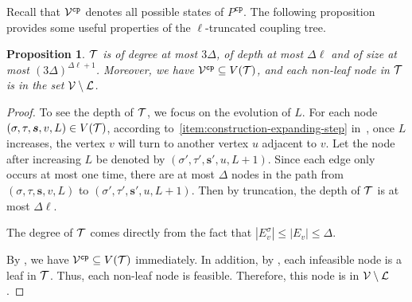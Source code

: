 \documentclass[11pt]{article}
\newtheorem{proposition}[theorem]{Proposition}
\newcommand{\abs}[1]{\left\vert#1\right\vert}
\def\!#1{\mathtt{#1}}
\def\cp{\!{cp}}
\newcommand{\seqS}{\boldsymbol{s}}
\newcommand{\hktodo}[1]{{\color{blue}{#1}}}
\begin{document}




Recall that $\+V^{\!{cp}}$ denotes all possible states of $P^{\!{cp}}$. The following proposition provides some useful properties of the $\ell$-truncated coupling tree.


\begin{proposition} \label{prop:property-of-truncated-tree}
$\mathcal{T}$ is of degree at most $3\Delta$, of depth at most $\Delta \ell$ and of size at most $\left(3\Delta\right)^{\Delta \ell + 1}$.
Moreover, we have $\+V^{\cp} \subseteq V(\+T)$, and each non-leaf node in $\mathcal{T}$ is in the set $\mathcal{V}\setminus\mathcal{L}$.
\end{proposition}

\hktodo{polish the proof here}
\begin{proof}
	To see the depth of $\mathcal{T}$, we focus on the evolution of $L$. For each node $(\sigma, \tau, \seqS, v, L) \in V(\+T)$, according to~\eqref{item:construction-expanding-step} in~, once $L$ increases, the vertex $v$ will turn to another vertex $u$ adjacent to $v$. Let the node after increasing $L$ be denoted by $(\sigma', \tau', \seqS', u, L + 1)$. Since each edge only occurs at most one time, there are at most $\Delta$ nodes in the path from $(\sigma, \tau, \seqS, v, L)$ to $(\sigma', \tau', \seqS', u, L + 1)$. Then by truncation, the depth of $\mathcal{T}$ is at most $\Delta \ell$.
	
	The degree of $\mathcal{T}$ comes directly from the fact that $\abs{E_v^\sigma} \le \abs{E_v} \le \Delta$.

    \hktodo{rewrite this paragraph}
    
    By , 
    we have $\+V^{\cp} \subseteq V(\+T)$ immediately.
    In addition, by ,  each infeasible node is a leaf in $\mathcal{T}$.
    Thus, each non-leaf node is feasible.
    Therefore, this node is in $ \mathcal{V}\setminus\mathcal{L}$.
    
\end{proof}
\end{document}
